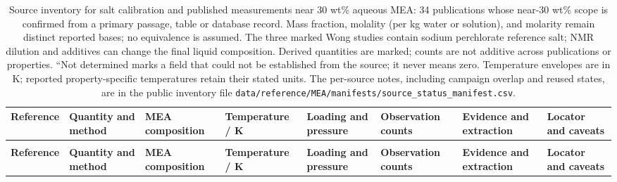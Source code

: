 \begin{landscape}
\begingroup
\fontsize{7}{8.4}\selectfont
\setlength{\tabcolsep}{2pt}
\setlength{\LTcapwidth}{24.5cm}
\renewcommand{\arraystretch}{1.08}
\begin{longtable}{@{}>{\raggedright\arraybackslash}p{2.0cm}>{\raggedright\arraybackslash}p{3.0cm}>{\raggedright\arraybackslash}p{3.3cm}>{\raggedright\arraybackslash}p{2.6cm}>{\raggedright\arraybackslash}p{3.2cm}>{\raggedright\arraybackslash}p{3.6cm}>{\raggedright\arraybackslash}p{2.2cm}>{\raggedright\arraybackslash}p{3.7cm}@{}}
\caption{Source inventory for salt calibration and published measurements near 30 wt\% aqueous MEA: 34 publications whose near-30 wt\% scope is confirmed from a primary passage, table or database record. Mass fraction, molality (per kg water or solution), and molarity remain distinct reported bases; no equivalence is assumed. The three marked Wong studies contain sodium perchlorate reference salt; NMR dilution and additives can change the final liquid composition. Derived quantities are marked; counts are not additive across publications or properties. ``Not determined marks a field that could not be established from the source; it never means zero. Temperature envelopes are in K; reported property-specific temperatures retain their stated units. The per-source notes, including campaign overlap and reused states, are in the public inventory file \nolinkurl{data/reference/MEA/manifests/source_status_manifest.csv}.}\label{tab:s4-data-inventory}\\
\toprule
\textbf{Reference} & \textbf{Quantity and method} & \textbf{MEA composition} & \textbf{Temperature / K} & \textbf{Loading and pressure} & \textbf{Observation counts} & \textbf{Evidence and extraction} & \textbf{Locator and caveats} \\
\midrule
\endfirsthead
\multicolumn{8}{l}{\tablename~\thetable{} (continued)}\\
\toprule
\textbf{Reference} & \textbf{Quantity and method} & \textbf{MEA composition} & \textbf{Temperature / K} & \textbf{Loading and pressure} & \textbf{Observation counts} & \textbf{Evidence and extraction} & \textbf{Locator and caveats} \\

\end{longtable}
\end{landscape}

